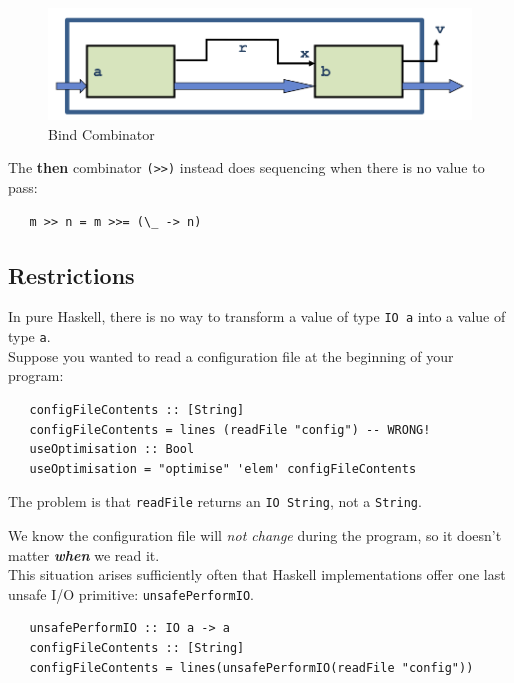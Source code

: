 \begin{figure}[htbp]
   \centering
   \includegraphics{images/bind_combinator.png}
   \caption{Bind Combinator}
   \label{fig:bind_combinator}
\end{figure}

The \textbf{then} combinator \lstinline|(>>)| instead does sequencing when there is no value to pass:
\begin{lstlisting}
   m >> n = m >>= (\_ -> n)
\end{lstlisting}

\subsection{Restrictions}
In pure Haskell, there is no way to transform a value of type
\lstinline|IO a| into a value of type \lstinline|a|.\\
Suppose you wanted to read a configuration file at the
beginning of your program:
\begin{lstlisting}
   configFileContents :: [String]
   configFileContents = lines (readFile "config") -- WRONG!
   useOptimisation :: Bool
   useOptimisation = "optimise" 'elem' configFileContents
\end{lstlisting}
The problem is that \lstinline|readFile| returns an \lstinline|IO String|, not a
\lstinline|String|.

We know the configuration file will \textit{not change}
during the program, so it doesn’t matter \textit{\textbf{when}} we
read it.\\
This situation arises sufficiently often that Haskell
implementations offer one last unsafe I/O primitive:
\lstinline|unsafePerformIO|.
\begin{lstlisting}
   unsafePerformIO :: IO a -> a
   configFileContents :: [String]
   configFileContents = lines(unsafePerformIO(readFile "config"))
\end{lstlisting}

